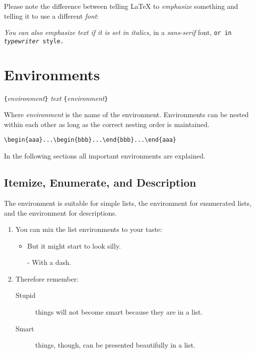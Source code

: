 Please note the difference between telling \LaTeX{} to
\emph{emphasize} something and telling it to use a different
\emph{font}:

\begin{example}
\textit{You can also
  \emph{emphasize} text if 
  it is set in italics,} 
\textsf{in a 
  \emph{sans-serif} font,}
\texttt{or in 
  \emph{typewriter} style.}
\end{example}

\section{Environments} \label{env}

\begin{lscommand}
\verb|{|\emph{environment}\verb|}|\quad
   \emph{text}\quad
{}\verb|{|\emph{environment}\verb|}|
\end{lscommand}
\noindent Where \emph{environment} is the name of the environment. Environments can be
nested within each other as long as the correct nesting order is
maintained.
\begin{code}
\verb|\begin{aaa}...\begin{bbb}...\end{bbb}...\end{aaa}|
\end{code}

\noindent In the following sections all important environments are explained.

\subsection{Itemize, Enumerate, and Description}

The  environment is suitable for simple lists, the
 environment for enumerated lists, and the
 environment for descriptions.

\begin{example}
\flushleft
\begin{enumerate}
\item You can mix the list
environments to your taste:
\begin{itemize}
\item But it might start to
look silly. 
\item[-] With a dash.
\end{itemize}
\item Therefore remember:
\begin{description}
\item[Stupid] things will not
become smart because they are
in a list.
\item[Smart] things, though, can be
presented beautifully in a list.
\end{description}
\end{enumerate}
\end{example}
 
